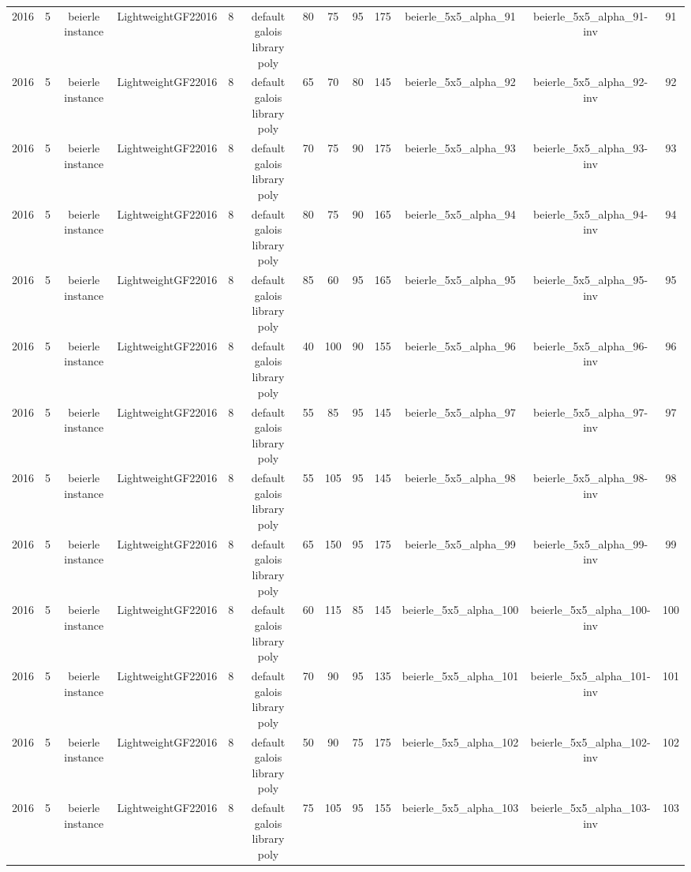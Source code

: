 \begin{tabular}{c c c c c c c c c c c c c}
2016 & 5 & beierle instance & LightweightGF22016 & 8 & default galois library poly & 80 & 75 & 95 & 175 & beierle_5x5_alpha_91 & beierle_5x5_alpha_91-inv & 91 \\
2016 & 5 & beierle instance & LightweightGF22016 & 8 & default galois library poly & 65 & 70 & 80 & 145 & beierle_5x5_alpha_92 & beierle_5x5_alpha_92-inv & 92 \\
2016 & 5 & beierle instance & LightweightGF22016 & 8 & default galois library poly & 70 & 75 & 90 & 175 & beierle_5x5_alpha_93 & beierle_5x5_alpha_93-inv & 93 \\
2016 & 5 & beierle instance & LightweightGF22016 & 8 & default galois library poly & 80 & 75 & 90 & 165 & beierle_5x5_alpha_94 & beierle_5x5_alpha_94-inv & 94 \\
2016 & 5 & beierle instance & LightweightGF22016 & 8 & default galois library poly & 85 & 60 & 95 & 165 & beierle_5x5_alpha_95 & beierle_5x5_alpha_95-inv & 95 \\
2016 & 5 & beierle instance & LightweightGF22016 & 8 & default galois library poly & 40 & 100 & 90 & 155 & beierle_5x5_alpha_96 & beierle_5x5_alpha_96-inv & 96 \\
2016 & 5 & beierle instance & LightweightGF22016 & 8 & default galois library poly & 55 & 85 & 95 & 145 & beierle_5x5_alpha_97 & beierle_5x5_alpha_97-inv & 97 \\
2016 & 5 & beierle instance & LightweightGF22016 & 8 & default galois library poly & 55 & 105 & 95 & 145 & beierle_5x5_alpha_98 & beierle_5x5_alpha_98-inv & 98 \\
2016 & 5 & beierle instance & LightweightGF22016 & 8 & default galois library poly & 65 & 150 & 95 & 175 & beierle_5x5_alpha_99 & beierle_5x5_alpha_99-inv & 99 \\
2016 & 5 & beierle instance & LightweightGF22016 & 8 & default galois library poly & 60 & 115 & 85 & 145 & beierle_5x5_alpha_100 & beierle_5x5_alpha_100-inv & 100 \\
2016 & 5 & beierle instance & LightweightGF22016 & 8 & default galois library poly & 70 & 90 & 95 & 135 & beierle_5x5_alpha_101 & beierle_5x5_alpha_101-inv & 101 \\
2016 & 5 & beierle instance & LightweightGF22016 & 8 & default galois library poly & 50 & 90 & 75 & 175 & beierle_5x5_alpha_102 & beierle_5x5_alpha_102-inv & 102 \\
2016 & 5 & beierle instance & LightweightGF22016 & 8 & default galois library poly & 75 & 105 & 95 & 155 & beierle_5x5_alpha_103 & beierle_5x5_alpha_103-inv & 103 \\

\end{tabular}
